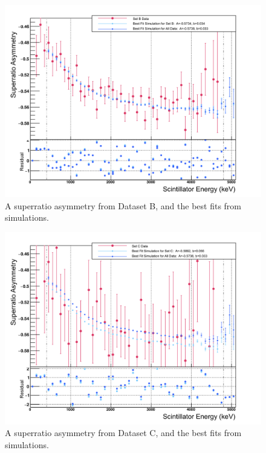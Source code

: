 %
\begin{figure}[h!t!b!]
	\centering
	\includegraphics[width=.999\linewidth]
	{Figures/BestAsymmetry_SetB.png}
	\caption[SetB Superratio Asymmetry]{A superratio asymmetry from Dataset B, and the best fits from simulations.}	
	\label{fig:asymmetryB}
\end{figure}
%
\begin{figure}[h!t!b!]
	\centering
	\includegraphics[width=.999\linewidth]
	{Figures/BestAsymmetry_SetC.png}
	\caption[SetC Superratio Asymmetry]{A superratio asymmetry from Dataset C, and the best fits from simulations.}	
	\label{fig:asymmetryC}
\end{figure}
%	
